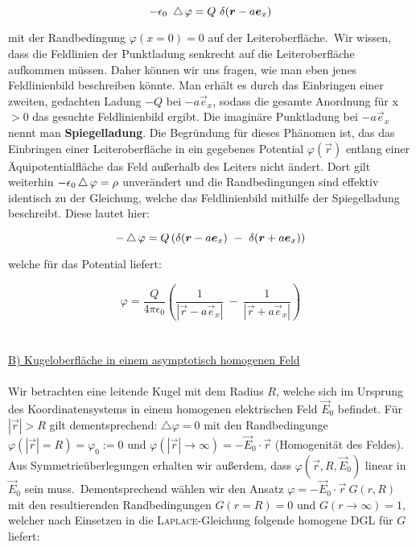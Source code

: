 \begin{equation*}
-\epsilon_0 \ \laplace\varphi = Q \ \delta(\vec{r}-a\vec{e}_x)
\end{equation*}

mit der Randbedingung $\varphi(x=0) = 0$ auf der Leiteroberfläche.\
Wir wissen, dass die Feldlinien der Punktladung senkrecht auf die Leiteroberfläche aufkommen müssen. Daher können wir uns fragen, wie man eben jenes Feldlinienbild beschreiben könnte. Man erhält es durch das Einbringen einer zweiten, gedachten Ladung $-Q$ bei $-a\vec{e}_x$, sodass die gesamte Anordnung für x$>0$ das gesuchte Feldlinienbild ergibt. Die imaginäre Punktladung bei $-a\vec{e}_x$ nennt man \textbf{Spiegelladung}. Die Begründung für dieses Phänomen ist, das das Einbringen einer Leiteroberfläche in ein gegebenes Potential $\varphi (\vec{r})$ entlang einer Äquipotentialfläche das Feld außerhalb des Leiters nicht ändert. Dort gilt weiterhin $-\epsilon_0 \mathop{{}\bigtriangleup}\nolimits\varphi = \rho$ unverändert und die Randbedingungen sind effektiv identisch zu der Gleichung, welche das Feldlinienbild mithilfe der Spiegelladung beschreibt. Diese lautet hier:

\begin{equation*}
- \laplace\varphi = Q \left(\delta(\vec{r}-a\vec{e}_x) \ - \ \delta(\vec{r}+a\vec{e}_x)\right)
\end{equation*}

welche für das Potential liefert:

\begin{equation*}
\varphi = \frac{Q}{4\pi\epsilon_0} \left(\frac{1}{|\vec{r}-a\vec{e}_x|} \ - \ \frac{1}{|\vec{r}+a\vec{e}_x|}\right)
\end{equation*}
\ \\
\ \\

\underline{B) Kugeloberfläche in einem asymptotisch homogenen Feld}\
\\
\ \\
Wir betrachten eine leitende Kugel mit dem Radius $R$, welche sich im Ursprung des Koordinatensystems in einem homogenen elektrischen Feld $\vec{E}_0$ befindet. Für $|\vec{r}|>R$ gilt dementsprechend: $\bigtriangleup\varphi = 0$ mit den Randbedingunge $\varphi(|\vec{r}| = R) = \varphi_0 := 0$ und $\varphi(|\vec{r}|\rightarrow\infty) = -\vec{E}_0\cdot\vec{r}$ (Homogenität des Feldes). Aus Symmetrieüberlegungen erhalten wir außerdem, dass $\varphi(\vec{r},R,\vec{E}_0)$ linear in $\vec{E}_0$ sein muss.\
Dementsprechend wählen wir den Ansatz $\varphi = -\vec{E}_0 \cdot\vec{r} \ G(r,R)$ mit den resultierenden Randbedingungen $G(r=R)=0$ und $G(r\rightarrow\infty
) =1$, welcher nach Einsetzen in die \textsc{Laplace}-Gleichung folgende homogene DGL für $G$ liefert:

